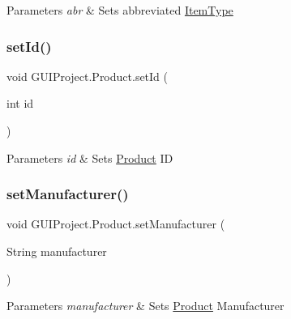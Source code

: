 \begin{DoxyParams}{Parameters}
{\em abr} & Sets abbreviated \mbox{\hyperlink{enum_g_u_i_project_1_1_item_type}{Item\+Type}} \\
\hline
\end{DoxyParams}
\mbox{\label{class_g_u_i_project_1_1_product_a4e64ff0d7cc5846709d34fb3893d8622}} 
\subsubsection{\texorpdfstring{setId()}{setId()}}
{\footnotesize\ttfamily void G\+U\+I\+Project.\+Product.\+set\+Id (\begin{DoxyParamCaption}\item[{int}]{id }\end{DoxyParamCaption})}


\begin{DoxyParams}{Parameters}
{\em id} & Sets \mbox{\hyperlink{class_g_u_i_project_1_1_product}{Product}} ID \\
\hline
\end{DoxyParams}
\mbox{\label{class_g_u_i_project_1_1_product_a3f89a084e7cd847f793e2999dbfe84c7}} 
\subsubsection{\texorpdfstring{setManufacturer()}{setManufacturer()}}
{\footnotesize\ttfamily void G\+U\+I\+Project.\+Product.\+set\+Manufacturer (\begin{DoxyParamCaption}\item[{String}]{manufacturer }\end{DoxyParamCaption})}


\begin{DoxyParams}{Parameters}
{\em manufacturer} & Sets \mbox{\hyperlink{class_g_u_i_project_1_1_product}{Product}} Manufacturer \\
\hline
\end{DoxyParams}
\mbox{\label{class_g_u_i_project_1_1_product_a823c9cda222692cfc3581bae16032ffa}} 
